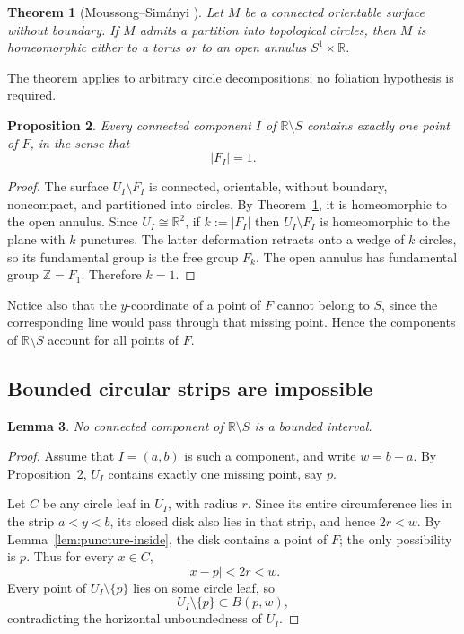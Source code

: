 \documentclass[11pt]{article}
\newtheorem{theorem}{Theorem}[section]
\newtheorem{lemma}[theorem]{Lemma}
\newtheorem{proposition}[theorem]{Proposition}
\newcommand{\R}{\mathbb{R}}
\newcommand{\Z}{\mathbb{Z}}
\begin{document}
\begin{theorem}[Moussong--Sim\'anyi \cite{MoussongSimanyi}]\label{thm:MS}
Let $M$ be a connected orientable surface without boundary. If $M$ admits a partition into topological circles, then $M$ is homeomorphic either to a torus or to an open annulus $S^1\times\R$.
\end{theorem}

The theorem applies to arbitrary circle decompositions; no foliation hypothesis is required.

\begin{proposition}\label{prop:onepuncturecomponent}
Every connected component $I$ of $\R\setminus S$ contains exactly one point of $F$, in the sense that
\[
|F_I|=1.
\]
\end{proposition}

\begin{proof}
The surface $U_I\setminus F_I$ is connected, orientable, without boundary, noncompact, and partitioned into circles. By Theorem~\ref{thm:MS}, it is homeomorphic to the open annulus. Since $U_I\cong\R^2$, if $k:=|F_I|$ then $U_I\setminus F_I$ is homeomorphic to the plane with $k$ punctures. The latter deformation retracts onto a wedge of $k$ circles, so its fundamental group is the free group $F_k$. The open annulus has fundamental group $\Z=F_1$. Therefore $k=1$.
\end{proof}

Notice also that the $y$-coordinate of a point of $F$ cannot belong to $S$, since the corresponding line would pass through that missing point. Hence the components of $\R\setminus S$ account for all points of $F$.

\subsection{Bounded circular strips are impossible}

\begin{lemma}\label{lem:noboundedstrip}
No connected component of $\R\setminus S$ is a bounded interval.
\end{lemma}

\begin{proof}
Assume that $I=(a,b)$ is such a component, and write $w=b-a$. By Proposition~\ref{prop:onepuncturecomponent}, $U_I$ contains exactly one missing point, say $p$.

Let $C$ be any circle leaf in $U_I$, with radius $r$. Since its entire circumference lies in the strip $a<y<b$, its closed disk also lies in that strip, and hence $2r<w$. By Lemma~\ref{lem:puncture-inside}, the disk contains a point of $F$; the only possibility is $p$. Thus for every $x\in C$,
\[
|x-p|<2r<w.
\]
Every point of $U_I\setminus\{p\}$ lies on some circle leaf, so
\[
U_I\setminus\{p\}\subset B(p,w),
\]
contradicting the horizontal unboundedness of $U_I$.
\end{proof}
\end{document}
